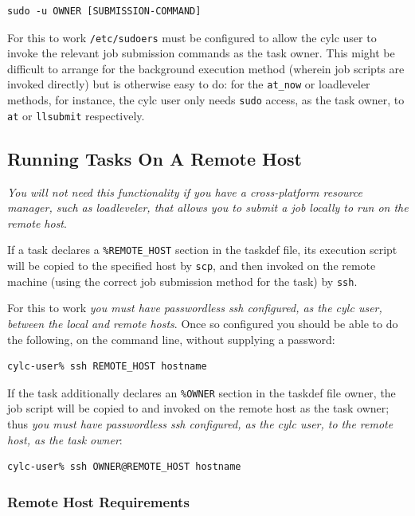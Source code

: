 \documentclass[11pt,a4paper]{article}
\begin{document}
\lstset{language=bash}

\begin{lstlisting}
sudo -u OWNER [SUBMISSION-COMMAND]
\end{lstlisting}

For this to work \lstinline=/etc/sudoers= must be configured to allow
the cylc user to invoke the relevant job submission commands as the task
owner.  This might be difficult to arrange for the background execution
method (wherein job scripts are invoked directly) but is
otherwise easy to do: for the \lstinline=at_now= or loadleveler methods,
for instance, the cylc user only needs \lstinline=sudo= access, as the
task owner, to \lstinline=at= or \lstinline=llsubmit= respectively.

\subsection{Running Tasks On A Remote Host}
\label{RunningTasksOnARemoteHost}

{\em You will not need this functionality if you have a cross-platform
resource manager, such as loadleveler, that allows you to submit a job
locally to run on the remote host}.

If a task declares a \lstinline=%REMOTE_HOST= section in the taskdef
file, its execution script will be copied to the specified host by 
\lstinline=scp=, and then invoked on the remote machine (using the
correct job submission method for the task) by \lstinline=ssh=. 

For this to work {\em you must have passwordless ssh configured, as 
the cylc user, between the local and remote hosts}. Once so configured
you should be able to do the following, on the command line, without
supplying a password:

\begin{lstlisting}
cylc-user% ssh REMOTE_HOST hostname
\end{lstlisting}

If the task additionally declares an \lstinline=%OWNER= section in the
taskdef file owner, the job script will be copied to and
invoked on the remote host as the task owner; thus {\em you must have
passwordless ssh configured, as the cylc user, to the remote host, as
the task owner}:

\begin{lstlisting}
cylc-user% ssh OWNER@REMOTE_HOST hostname
\end{lstlisting}


\subsubsection{Remote Host Requirements}
\end{document}
